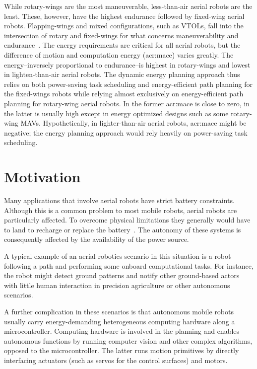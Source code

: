 While rotary-wings are the most maneuverable, less-than-air aerial robots are the least. These, however, have the highest endurance followed by fixed-wing aerial robots. Flapping-wings and mixed configurations, such as VTOLs, fall into the intersection of rotary and fixed-wings for what concerns maneuverability and endurance~\citep{siciliano2016springer}. The energy requirements are critical for all aerial robots, but the difference of motion and computation energy (\Gls{acr:mace}) varies greatly. The energy--inversely proportional to endurance--is highest in rotary-wings and lowest in lighten-than-air aerial robots. The dynamic energy planning approach thus relies on both power-saving task scheduling and energy-efficient path planning for the fixed-wings robots while relying almost exclusively on energy-efficient path planning for rotary-wing aerial robots. In the former \Gls{acr:mace} is close to zero, in the latter is usually high except in energy optimized designs such as some rotary-wing MAVs. Hypothetically, in lighter-than-air aerial robots, \Gls{acr:mace} might be negative; the energy planning approach would rely heavily on power-saving task scheduling.


\section{Motivation}
\label{sec:motivation}

Many applications that involve aerial robots have strict battery constraints. Although this is a common problem to most mobile robots, aerial robots are particularly affected. To overcome physical limitations they generally would have to land to recharge or replace the battery~\citep{zamanakos2020energy}. The autonomy of these systems is consequently affected by the availability of the power source. 

A typical example of an aerial robotics scenario in this situation is a robot following a path and performing some onboard computational tasks. For instance, the robot might detect ground patterns and notify other ground-based actors with little human interaction in precision agriculture or other autonomous scenarios.

A further complication in these scenarios is that autonomous mobile robots usually carry energy-demanding heterogeneous computing hardware along a microcontroller. Computing hardware is involved in the planning and enables autonomous functions by running computer vision and other complex algorithms, opposed to the microcontroller. The latter runs motion primitives by directly interfacing actuators (such as servos for the control surfaces) and motors.

